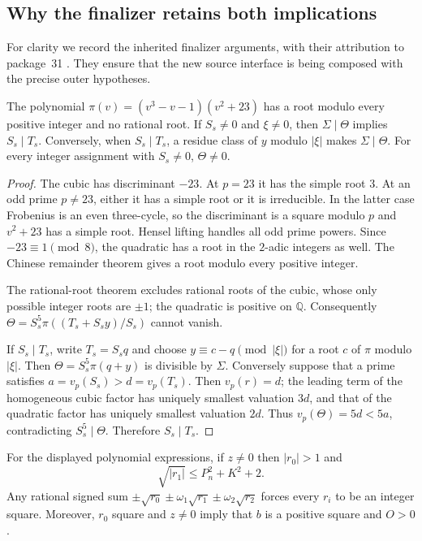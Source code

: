\subsection{Why the finalizer retains both implications}
\label{b4:finalizer}

For clarity we record the inherited finalizer arguments, with their
attribution to package~31 \cite{Package31}.  They ensure that the new
source interface is being composed with the precise outer hypotheses.

\begin{lemma}
\label{b4:quintic}
The polynomial
$\pi(v)=(v^3-v-1)(v^2+23)$ has a root modulo every positive integer
and no rational root.  If $S_s\ne0$ and $\xi\ne0$, then
$\Sigma\mid\Theta$ implies $S_s\mid T_s$.
Conversely, when $S_s\mid T_s$, a residue class of $y$ modulo
$|\xi|$ makes $\Sigma\mid\Theta$.  For every integer assignment
with $S_s\ne0$, $\Theta\ne0$.
\end{lemma}

\begin{proof}
The cubic has discriminant $-23$.  At $p=23$ it has the simple
root $3$.  At an odd prime $p\ne23$, either it has a simple root
or it is irreducible.  In the latter case Frobenius is an even
three-cycle, so the discriminant is a square modulo $p$ and
$v^2+23$ has a simple root.  Hensel lifting handles all odd prime
powers.  Since $-23\equiv1\pmod8$, the quadratic has a root in
the $2$-adic integers as well.  The Chinese remainder theorem
gives a root modulo every positive integer.

The rational-root theorem excludes rational roots of the cubic,
whose only possible integer roots are $\pm1$; the quadratic is
positive on $\mathbb Q$.  Consequently
$\Theta=S_s^5\pi((T_s+S_sy)/S_s)$ cannot vanish.

If $S_s\mid T_s$, write $T_s=S_sq$ and choose
$y\equiv c-q\pmod{|\xi|}$ for a root $c$ of $\pi$ modulo $|\xi|$.
Then $\Theta=S_s^5\pi(q+y)$ is divisible by $\Sigma$.
Conversely suppose that a prime satisfies
$a=v_p(S_s)>d=v_p(T_s)$.  Then $v_p(r)=d$; the leading term of
the homogeneous cubic factor has uniquely smallest valuation
$3d$, and that of the quadratic factor has uniquely smallest
valuation $2d$.  Thus $v_p(\Theta)=5d<5a$, contradicting
$S_s^5\mid\Theta$.  Therefore $S_s\mid T_s$.
\end{proof}

\begin{lemma}
\label{b4:separation}
For the displayed polynomial expressions, if $z\ne0$ then
$|r_0|>1$ and
\[
 \sqrt{|r_1|}\le P_n^2+K^2+2.
 \tag{B4.13}\label{b4:r1bound}
\]
Any rational signed sum
$\pm\sqrt{r_0}\pm\omega_1\sqrt{r_1}\pm\omega_2\sqrt{r_2}$
forces every $r_i$ to be an integer square.
Moreover, $r_0$ square and $z\ne0$ imply that $b$ is a positive
square and $O>0$.
\end{lemma}

